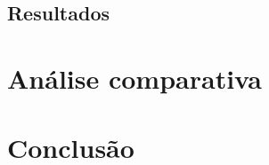 \documentclass[
	article,			        %
	11pt,				          %
	oneside,			        %
	a4paper,			        %
	english,			        %
	brazil,				        %
	sumario=tradicional
]{abntex2}\usepackage[]{graphicx}\usepackage[]{color}
\begin{document}
\subsection{Resultados}


\section{Análise comparativa}

% 

\section*{Conclusão}



\postextual





\end{document}
